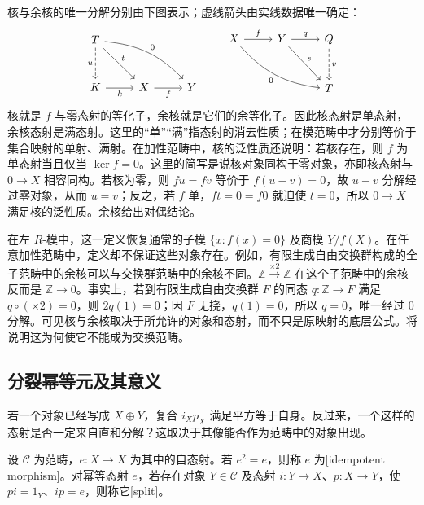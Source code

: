 核与余核的唯一分解分别由下图表示；虚线箭头由实线数据唯一确定：
\[
	\begin{tikzcd}[column sep=2.5em,row sep=2.8em]
		T\arrow[d,dashed,"u"']\arrow[dr,"t"]\arrow[drr,bend left=20,"0"]&&\\
		K\arrow[r,"k"']&X\arrow[r,"f"']&Y
	\end{tikzcd}
	\qquad
	\begin{tikzcd}[column sep=2.5em,row sep=2.8em]
		X\arrow[r,"f"]\arrow[drr,bend right=20,"0"']&Y\arrow[r,"q"]\arrow[dr,"s"]&Q\arrow[d,dashed,"v"]\\
		&&T
	\end{tikzcd}
\]
核就是 \(f\) 与零态射的等化子，余核就是它们的余等化子。因此核态射是单态射，余核态射是满态射。这里的“单”“满”指态射的消去性质；在模范畴中才分别等价于集合映射的单射、满射。在加性范畴中，核的泛性质还说明：若核存在，则 \(f\) 为单态射当且仅当 \(\ker f=0\)。这里的简写是说核对象同构于零对象，亦即核态射与 \(0\to X\) 相容同构。若核为零，则 \(fu=fv\) 等价于 \(f(u-v)=0\)，故 \(u-v\) 分解经过零对象，从而 \(u=v\)；反之，若 \(f\) 单，\(ft=0=f0\) 就迫使 \(t=0\)，所以 \(0\to X\) 满足核的泛性质。余核给出对偶结论。

\ProseParagraphBreak
在左 \(R\)-模中，这一定义恢复通常的子模 \(\{x:f(x)=0\}\) 及商模 \(Y/f(X)\)。在任意加性范畴中，定义却不保证这些对象存在。例如，有限生成自由交换群构成的全子范畴中的余核可以与交换群范畴中的余核不同。\(\mathbb Z\xrightarrow{\times2}\mathbb Z\) 在这个子范畴中的余核反而是 \(\mathbb Z\to0\)。事实上，若到有限生成自由交换群 \(F\) 的同态 \(q:\mathbb Z\to F\) 满足 \(q\circ(\times2)=0\)，则 \(2q(1)=0\)；因 \(F\) 无挠，\(q(1)=0\)，所以 \(q=0\)，唯一经过 \(0\) 分解。可见核与余核取决于所允许的对象和态射，而不只是原映射的底层公式。将说明这为何使它不能成为交换范畴。

\subsection{分裂幂等元及其意义}
\label{b4:subsec:0401:03}

若一个对象已经写成 \(X\oplus Y\)，复合 \(i_Xp_X\) 满足平方等于自身。反过来，一个这样的态射是否一定来自直和分解？这取决于其像能否作为范畴中的对象出现。

\begin{definition}\label{b4:def:split-idempotent}
	设 \(\mathcal C\) 为范畴，\(e:X\to X\) 为其中的自态射。若 \(e^2=e\)，则称 \(e\) 为[idempotent morphism]。对幂等态射 \(e\)，若存在对象 \(Y\in\mathcal C\) 及态射 \(i:Y\to X\)、\(p:X\to Y\)，使 \(pi=1_Y\)、\(ip=e\)，则称它[split]。
\end{definition}


